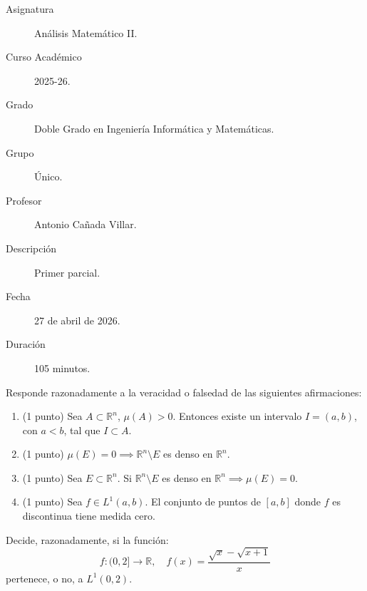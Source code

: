 \documentclass[12pt]{article}
\begin{document}

    
    

    \begin{description}
        \item[Asignatura] Análisis Matemático II.
        \item[Curso Académico] 2025-26.
        \item[Grado] Doble Grado en Ingeniería Informática y Matemáticas.
        \item[Grupo] Único.
        \item[Profesor] Antonio Cañada Villar.
        \item[Descripción] Primer parcial.
        \item[Fecha] 27 de abril de 2026.
        \item[Duración] 105 minutos.
    \end{description}
    \newpage
    \begin{ejercicio}
        Responde razonadamente a la veracidad o falsedad de las siguientes afirmaciones:
        \begin{enumerate}
            \item (1 punto) Sea $A \subset \mathbb{R}^n$, $\mu(A) > 0$. Entonces existe un intervalo $I = (a, b)$, con $a < b$, tal que $I \subset A$.
            
            \item (1 punto) $\mu(E) = 0 \implies \mathbb{R}^n \setminus E$ es denso en $\mathbb{R}^n$. 
            
            \item (1 punto) Sea $E \subset \mathbb{R}^n$. Si $\mathbb{R}^n \setminus E$ es denso en $\mathbb{R}^n \implies \mu(E) = 0$.
            
            \item (1 punto) Sea $f \in L^1(a, b)$. El conjunto de puntos de $[a, b]$ donde $f$ es discontinua tiene medida cero.
        \end{enumerate}
    \end{ejercicio}

    \begin{ejercicio}[3 puntos]
        Decide, razonadamente, si la función:
        $$ f: (0, 2] \rightarrow \mathbb{R}, \quad f(x) = \frac{\sqrt{x} - \sqrt{x+1}}{x} $$
        pertenece, o no, a $L^1(0, 2)$.
    \end{ejercicio}
\end{document}
